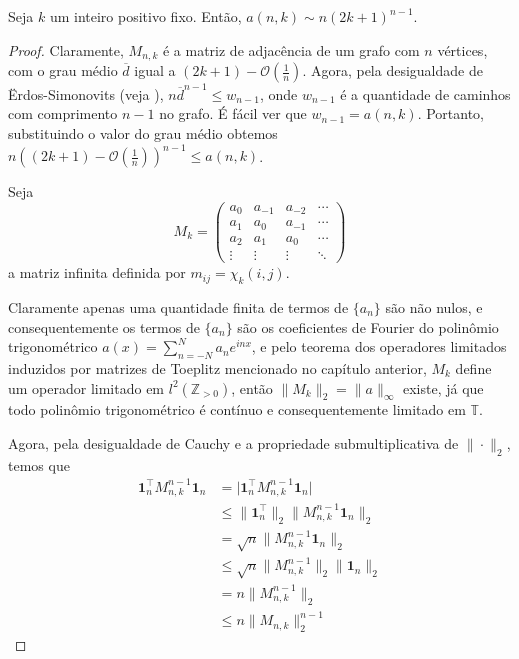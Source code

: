 \begin{theorem} \label{th:asymptotic} Seja $k$ um inteiro positivo fixo. Então, $a(n, k) \sim n(2k+1)^{n-1}$. \end{theorem} \begin{proof} Claramente, $M_{n,k}$ é a matriz de adjacência de um grafo com $n$ vértices, com o grau médio $\overline{d}$ igual a $(2k + 1) - \mathcal{O}(\frac{1}{n})$. Agora, pela desigualdade de Ërdos-Simonovits (veja \cite{erdossimonovits}), $n \overline{d}^{n-1} \le w_{n-1}$, onde $w_{n-1}$ é a quantidade de caminhos com comprimento $n-1$ no grafo. É fácil ver que $w_{n-1} = a(n, k)$. Portanto, substituindo o valor do grau médio obtemos $n ((2k + 1) - \mathcal{O}(\frac{1}{n}))^{n-1} \le a(n, k)$.

  Seja \[M_k = \begin{pmatrix} a_{0} & a_{-1} & a_{-2} & \cdots \\ a_{1} & a_{0} & a_{-1} & \cdots \\ a_2 & a_{1} & a_{0} & \cdots \\ \vdots & \vdots & \vdots & \ddots \end{pmatrix}\] a matriz infinita definida por $m_{ij} = \chi_k(i, j)$.

  Claramente apenas uma quantidade finita de termos de $\{a_n\}$ são não nulos, e consequentemente os termos de $\{ a_n \}$ são os coeficientes de Fourier do polinômio trigonométrico $a(x) = \sum_{n = -N}^N a_n e^{i n x}$, e pelo teorema dos operadores limitados induzidos por matrizes de Toeplitz mencionado no capítulo anterior, $M_k$ define um operador limitado em $l^2(\mathbb{Z}_{> 0})$, então $\|M_k\|_2 = \| a \|_{\infty}$ existe, já que todo polinômio trigonométrico é contínuo e consequentemente limitado em $\mathbb{T}$.

  Agora, pela desigualdade de Cauchy e a propriedade submultiplicativa de $\| \cdot \|_2$, temos que
  \begin{align*}
    \mathbf{1}_n^\intercal M_{n,k}^{n-1} \mathbf{1}_n & = \lvert \mathbf{1}_n^\intercal M_{n,k}^{n-1} \mathbf{1}_n\rvert      \\
                                                      & \le \| \mathbf{1}_n^\intercal \|_2 \| M_{n,k}^{n-1} \mathbf{1}_n \|_2 \\
                                                      & = \sqrt{n} \| M_{n,k}^{n-1} \mathbf{1}_n \|_2                         \\
                                                      & \le \sqrt{n} \| M_{n,k}^{n-1} \|_2 \| \mathbf{1}_n \|_2               \\
                                                      & = n \| M_{n,k}^{n-1} \|_2                                             \\
                                                      & \le n \| M_{n,k} \|_2^{n-1}
  \end{align*}


\end{proof}
